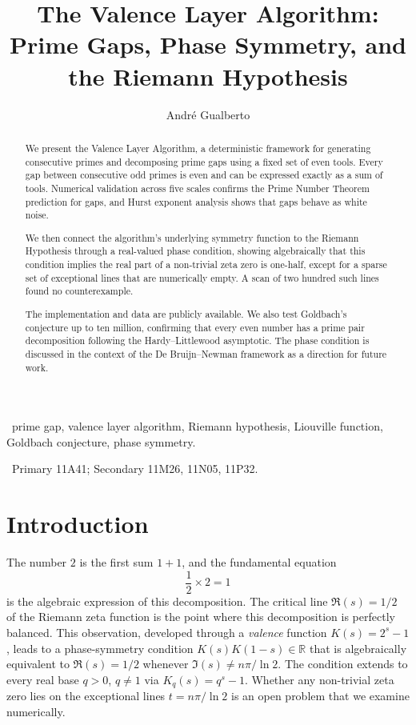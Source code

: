 \documentclass[12pt,a4paper]{article}
\title{The Valence Layer Algorithm:\\Prime Gaps, Phase Symmetry, and\\the Riemann Hypothesis}
\author{Andr\'e Gualberto}
\theoremstyle{plain}
\begin{document}
\maketitle

\begin{abstract}
We present the Valence Layer Algorithm, a deterministic framework
for generating consecutive primes and decomposing prime gaps using a
fixed set of even tools.  Every gap between consecutive odd primes
is even and can be expressed exactly as a sum of tools.  Numerical
validation across five scales confirms the Prime Number Theorem
prediction for gaps, and Hurst exponent analysis shows that gaps
behave as white noise.

We then connect the algorithm's underlying symmetry function to the
Riemann Hypothesis through a real-valued phase condition, showing
algebraically that this condition implies the real part of a
non-trivial zeta zero is one-half, except for a sparse set of
exceptional lines that are numerically empty.  A scan of two hundred
such lines found no counterexample.

The implementation and data are publicly available.  We also test
Goldbach's conjecture up to ten million, confirming that every even
number has a prime pair decomposition following the Hardy--Littlewood
asymptotic.  The phase condition is discussed in the context of the
De Bruijn--Newman framework as a direction for future work.
\end{abstract}

\ prime gap, valence layer algorithm,
Riemann hypothesis, Liouville function, Goldbach conjecture,
phase symmetry.

\ Primary 11A41;
Secondary 11M26, 11N05, 11P32.

\section{Introduction}
\label{sec:intro}

The number $2$ is the first sum $1+1$, and the fundamental equation
\[
\frac12 \times 2 = 1
\]
is the algebraic expression of this decomposition.
The critical line $\Re(s)=1/2$ of the Riemann zeta function is the
point where this decomposition is perfectly balanced.
This observation, developed through a {\it valence} function
$K(s)=2^s-1$, leads to a phase-symmetry condition
$K(s)K(1-s)\in\mathbb{R}$ that is algebraically equivalent to
$\Re(s)=1/2$ whenever $\Im(s)\neq n\pi/\ln2$.  The condition
extends to every real base $q>0$, $q\neq1$ via $K_q(s)=q^s-1$.
Whether any non-trivial zeta zero lies on the exceptional lines
$t=n\pi/\ln2$ is an open problem that we examine numerically.
\end{document}

